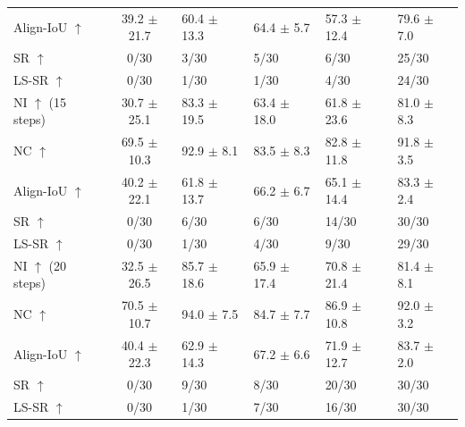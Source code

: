 \documentclass[journal]{IEEEtran}
\begin{document}
\begin{table}[t!]
{\begin{tabular}{l|cp{2.3cm}p{2.3cm}p{2.3cm}||p{2.3cm}}
Align-IoU $\uparrow$ & 39.2 $\pm$ 21.7 & \cellcolor{red!25}60.4 $\pm$ 13.3 & \cellcolor{yellow!25}64.4 $\pm$ 5.7 & 57.3 $\pm$ 12.4 & \cellcolor{green!25}79.6 $\pm$ 7.0 \\
SR $\uparrow$ & 0/30 & 3/30 & \cellcolor{red!25}5/30 & \cellcolor{yellow!25}6/30 & \cellcolor{green!25}25/30 \\
LS-SR $\uparrow$ & 0/30 & \cellcolor{red!25}1/30 & \cellcolor{red!25}1/30 & \cellcolor{yellow!25}4/30 & \cellcolor{green!25}24/30 \\
\hline
NI $\uparrow$ (15 steps) & 30.7 $\pm$ 25.1 & \cellcolor{green!25}83.3 $\pm$ 19.5 & \cellcolor{red!25}63.4 $\pm$ 18.0 & 61.8 $\pm$ 23.6 & \cellcolor{yellow!25}81.0 $\pm$ 8.3 \\
NC $\uparrow$ & 69.5 $\pm$ 10.3 & \cellcolor{green!25}92.9 $\pm$ 8.1 & \cellcolor{red!25}83.5 $\pm$ 8.3 & 82.8 $\pm$ 11.8 & \cellcolor{yellow!25}91.8 $\pm$ 3.5 \\
Align-IoU $\uparrow$ & 40.2 $\pm$ 22.1 & 61.8 $\pm$ 13.7 & \cellcolor{yellow!25}66.2 $\pm$ 6.7 & \cellcolor{red!25}65.1 $\pm$ 14.4 & \cellcolor{green!25}83.3 $\pm$ 2.4 \\
SR $\uparrow$ & 0/30 & \cellcolor{red!25}6/30 & \cellcolor{red!25}6/30 & \cellcolor{yellow!25}14/30 & \cellcolor{green!25}30/30 \\
LS-SR $\uparrow$ & 0/30 & 1/30 & \cellcolor{red!25}4/30 & \cellcolor{yellow!25}9/30 & \cellcolor{green!25}29/30 \\
\hline
NI $\uparrow$ (20 steps) & 32.5 $\pm$ 26.5 & \cellcolor{green!25}85.7 $\pm$ 18.6 & 65.9 $\pm$ 17.4 & \cellcolor{red!25}70.8 $\pm$ 21.4 & \cellcolor{yellow!25}81.4 $\pm$ 8.1 \\
NC $\uparrow$ & 70.5 $\pm$ 10.7 & \cellcolor{green!25}94.0 $\pm$ 7.5 & 84.7 $\pm$ 7.7 & \cellcolor{red!25}86.9 $\pm$ 10.8 & \cellcolor{yellow!25}92.0 $\pm$ 3.2 \\
Align-IoU $\uparrow$ & 40.4 $\pm$ 22.3 & 62.9 $\pm$ 14.3 & \cellcolor{red!25}67.2 $\pm$ 6.6 & \cellcolor{yellow!25}71.9 $\pm$ 12.7 & \cellcolor{green!25}83.7 $\pm$ 2.0 \\
SR $\uparrow$ & 0/30 & \cellcolor{red!25}9/30 & 8/30 & \cellcolor{yellow!25}20/30 & \cellcolor{green!25}30/30 \\
LS-SR $\uparrow$ & 0/30 & 1/30 & \cellcolor{red!25}7/30 & \cellcolor{yellow!25}16/30 & \cellcolor{green!25}30/30 \\
\bottomrule
\end{tabular}
}
\end{table}
\end{document}
